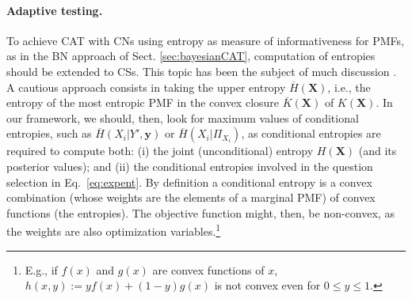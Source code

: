 \documentclass[runningheads]{llncs}
\begin{document}
	\paragraph{Adaptive testing.}
	To achieve CAT with CNs using entropy as measure of informativeness for PMFs, as in 
	the BN approach of Sect. \ref{sec:bayesianCAT}, computation of entropies should be 
	extended to CSs. This topic has been the subject of much discussion 
	\cite{klir1999uncertainty}. A cautious approach \cite{abellan2003maximum} consists in 
	taking the upper entropy $\overline{H}(\bm{X})$, i.e., the entropy of the most entropic 
	PMF in the convex closure $\overline{K}(\bm{X})$ of  $K(\bm{X})$. 
	In our framework, we should, then, look for maximum values of conditional entropies, 
	such as $\overline{H}(X_i|Y',\bm{y})$ or $\overline{H}(X_i|\Pi_{X_i})$, as conditional 
	entropies are required to compute both: (i) the joint (unconditional) entropy 
	$H(\bm{X})$ (and its posterior values); and (ii) the conditional entropies  involved in 
	the  question selection in Eq.~\eqref{eq:expent}.
	By definition a conditional entropy is a convex combination (whose weights are the 
	elements of a marginal PMF) of convex functions (the entropies). The objective 
	function might, then, be non-convex, as the weights are also optimization 
	variables.\footnote{E.g., if $f(x)$ and $g(x)$ are convex functions of $x$, $h(x,y):= y 
	f(x) + (1-y) g(x)$ is not convex even for $0 \leq y \leq 1$.} 
\end{document}
